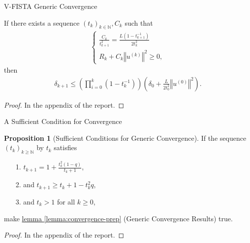 \documentclass[11pt]{beamer}
\theoremstyle{definition}
\newtheorem{prop}{Proposition}[section]
\begin{document}
    \begin{frame}{V-FISTA Generic Convergence}
        \begin{lemma}\label{lemma:convergence-prep}
            If there exists a sequence $(t_k)_{k\in \mathbb N}, C_k$ such that 
            \begin{align}
                \begin{cases}
                    \frac{C_k}{t_{k + 1}^2} = \frac{L(1 - t^{-1}_{k + 1})}{2t_{k}^2}
                    \\
                    R_k + C_k\left\Vert
                        u^{(k)}
                    \right\Vert^2 \ge 0, 
                \end{cases}
            \end{align}
            then 
            \begin{align*}
                \delta_{k + 1}
                \le 
                \left(
                    \prod_{i = 0}^{k} (1 - t_k^{-1})
                \right)\left(
                    \delta_0 + \frac{L}{2t_0^2}\left\Vert
                        u^{(0)}
                    \right\Vert^2
                \right). 
            \end{align*}
        \end{lemma}
        \begin{proof}
            In the appendix of the report. 
        \end{proof}
    \end{frame}
    \begin{frame}{A Sufficient Condition for Convergence}
        \begin{prop}[Sufficient Conditions for Generic Convergence]
            If the sequence $(t_k)_{k \ge \mathbb N}$ by $t_{k}$ satisfies 
            \begin{itemize}
                \item [1.] $t_{k + 1} = 1 + \frac{t_k^2(1 - q)}{t_k + 1}$, 
                \item [2.] and $t_{k + 1} \ge t_k + 1 - t_k^2q$, 
                \item [3.] and $t_k > 1$ for all $k\ge 0$, 
            \end{itemize}
            make \hyperref[lemma:convergence-prep]{lemma \ref*{lemma:convergence-prep}} (Generic Convergence Results) true. 
        \end{prop}
        \begin{proof}
            In the appendix of the report. 
        \end{proof}
    \end{frame}
\end{document}
